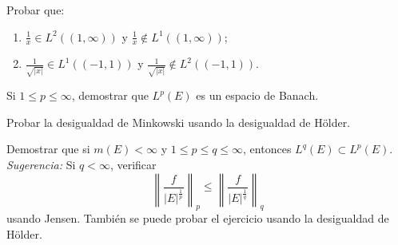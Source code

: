 \documentclass{book}
\newcommand{\rr}{\mathbb{R}}
\begin{document}
\begin{ejer}{}
 Probar que:
	\begin{enumerate}
  \item $\frac{1}{x}\in L^2((1,\infty))$ y $\frac{1}{x}\not \in L^1((1,\infty))$;
  \item $\frac{1}{\sqrt{|x|}}\in L^1((-1,1))$ y $\frac{1}{\sqrt{|x|}}\not \in L^2((-1,1))$.
	\end{enumerate}
\end{ejer}


\begin{ejer}{} 
Si $1\leq p \leq \infty$, demostrar que
		$L^p(E)$ es un espacio de Banach.
	\end{ejer}
	
	
	\begin{ejer}{}
	Probar la desigualdad de Minkowski usando la desigualdad de H\"older.
	\end{ejer}
	
	\begin{ejer}{}
 Demostrar que si $m(E)<\infty$ y $1\leq p\leq q \leq \infty$, entonces 
$L^{q}(E)\subset L^{p}(E)$.
\\
{\it Sugerencia:} Si $q<\infty$, verificar 
$$\left\|\frac{f}{|E|^{\frac{1}{p}}}\right\|_p\leq
\left\|\frac{f}{|E|^{\frac{1}{q}}}\right\|_q$$
usando Jensen.
Tambi\'en se puede probar el ejercicio usando la desigualdad de H\"older.
\end{ejer}

\end{document}
